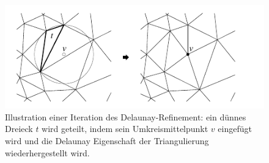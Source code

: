 

 \begin{figure}[h]
    \centering
    \includegraphics[width=5in]{images/delaunay_refinement.png}
    \caption{Illustration einer Iteration des Delaunay-Refinement: ein dünnes Dreieck $t$ wird geteilt, indem sein Umkreismittelpunkt $v$ eingefügt wird und die Delaunay Eigenschaft der Triangulierung wiederhergestellt wird. \cite{SHEWCHUK:2002:chuws} }
    \label{fig:Punkt_einfügen}
\end{figure}



